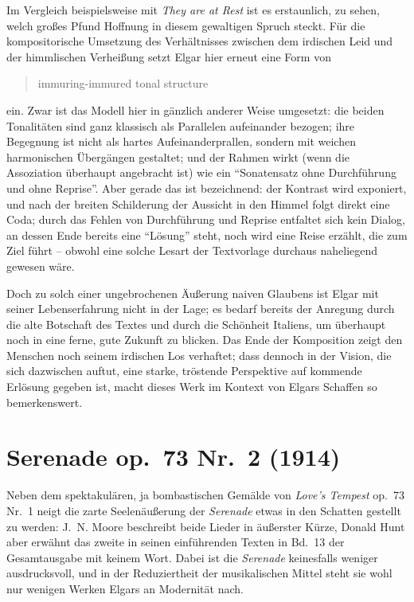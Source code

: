 \documentclass[a4paper,11pt,open=any]{scrbook}
\newcommand{\engquote}[1]{\foreignblockquote{english}{#1}}
\begin{document}
Im Vergleich beispielsweise mit \textit{They are at Rest} ist es erstaunlich,
zu sehen, welch großes Pfund Hoffnung in diesem gewaltigen Spruch steckt.
Für die kompositorische Umsetzung des Verhältnisses zwischen dem irdischen
Leid und der himmlischen Verheißung setzt Elgar hier erneut eine Form von
\engquote{immuring-immured tonal structure} ein.  Zwar ist das Modell hier
in gänzlich anderer Weise umgesetzt: die beiden Tonalitäten sind ganz
klassisch als Parallelen aufeinander bezogen; ihre Begegnung ist nicht
als hartes Aufeinanderprallen, sondern mit weichen harmonischen Übergängen
gestaltet; und der Rahmen wirkt (wenn die Assoziation überhaupt angebracht
ist) wie ein \enquote{Sonatensatz ohne Durchführung und ohne Reprise}.  Aber
gerade das ist bezeichnend: der Kontrast wird exponiert, und nach der breiten
Schilderung der Aussicht in den Himmel folgt direkt eine Coda; durch das
Fehlen von Durchführung und Reprise entfaltet sich kein Dialog, an dessen
Ende bereits eine \enquote{Lösung} steht, noch wird eine Reise erzählt,
die zum Ziel führt – obwohl eine solche Lesart der Textvorlage durchaus
naheliegend gewesen wäre.

Doch zu solch einer ungebrochenen Äußerung naiven Glaubens ist Elgar mit
seiner Lebenserfahrung nicht in der Lage; es bedarf bereits der Anregung
durch die alte Botschaft des Textes und durch die Schönheit Italiens, um
überhaupt noch in eine ferne, gute Zukunft zu blicken.  Das Ende der
Komposition zeigt den Menschen noch seinem irdischen Los verhaftet; dass
dennoch in der Vision, die sich dazwischen auftut, eine starke, tröstende
Perspektive auf kommende Erlösung gegeben ist, macht dieses Werk im Kontext
von Elgars Schaffen so bemerkenswert.

\section{Serenade \textmd{op.~73 Nr.~2 (1914)}}
Neben dem spektakulären, ja bombastischen Gemälde von \textit{Love’s Tempest}
op.~73 Nr.~1 neigt die zarte Seelenäußerung der \textit{Serenade} etwas in
den Schatten gestellt zu werden: J.~N. Moore\cite[S.~661.  Moore irrt sich
mit der Tonart des Stückes – lag ihm womöglich eine Bearbeitung für Frauen-
oder Männerchor vor? Der umgekehrte Fall war ihm bereits bei der Besprechung
von \textit{The Reveille} op.~52 unterlaufen, wo er die Version für gemischten
Chor bespricht, obwohl das Stück zuerst für Männerchor geschrieben ist.
Allerdings verzeichnet die Gesamtausgabe keine solche Bearbeitung.]{moore}
beschreibt beide Lieder in äußerster Kürze, Donald Hunt aber erwähnt das
zweite in seinen einführenden Texten in Bd.~13 der Gesamtausgabe\cite{ece13}
mit keinem Wort.  Dabei ist die \textit{Serenade} keinesfalls weniger
ausdrucksvoll, und in der Reduziertheit der musikalischen Mittel steht
sie wohl nur wenigen Werken Elgars an Modernität nach.
\end{document}
